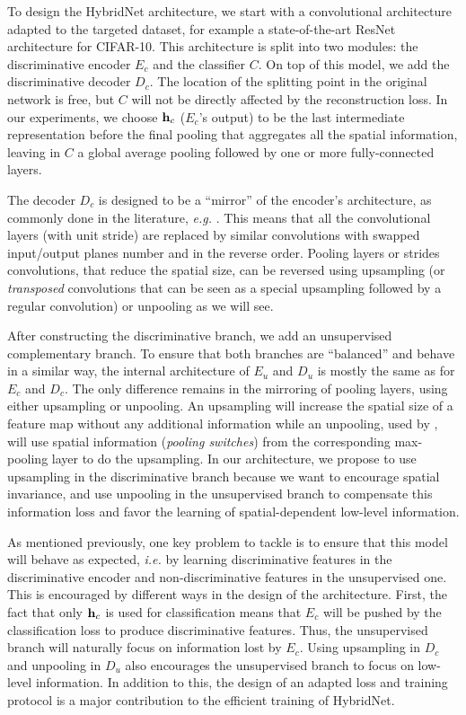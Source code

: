 To design the HybridNet architecture, we start with a convolutional architecture adapted to the targeted dataset, for example a state-of-the-art ResNet architecture for CIFAR-10. This architecture is split into two modules: the discriminative encoder $E_c$ and the classifier $C$. On top of this model, we add the discriminative decoder $D_c$.
The location of the splitting point in the original network is free, but $C$ will not be directly affected by the reconstruction loss. In our experiments, we choose $\mathbf{h}_c$ ($E_c$'s output) to be the last intermediate representation before the final pooling that aggregates all the spatial information, leaving in $C$ a global average pooling followed by one or more fully-connected layers.

The decoder $D_c$ is designed to be a ``mirror'' of the encoder's architecture, as commonly done in the literature, \textit{e.g.} \citep{Zhao2016a,Rasmus2015,zeiler2014visualizing}. This means that all the convolutional layers (with unit stride) are replaced by similar convolutions with swapped input/output planes number and in the reverse order. Pooling layers or strides convolutions, that reduce the spatial size, can be reversed using upsampling (or \textit{transposed} convolutions \citep[\textit{cf.}][]{dumoulin2016guide} that can be seen as a special upsampling followed by a regular convolution) or unpooling as we will see.

After constructing the discriminative branch, we add an unsupervised complementary branch. To ensure that both branches are ``balanced'' and behave in a similar way, the internal architecture of $E_u$ and $D_u$ is mostly the same as for $E_c$ and $D_c$.
The only difference remains in the mirroring of pooling layers, using either upsampling or unpooling. An upsampling will increase the spatial size of a feature map without any additional information while an unpooling, used by \citet{Zhao2016a,Zhang2016a}, will use spatial information (\textit{pooling switches}) from the corresponding max-pooling layer to do the upsampling. In our architecture, we propose to use upsampling in the discriminative branch because we want to encourage spatial invariance, and use unpooling in the unsupervised branch to compensate this information loss and favor the learning of spatial-dependent low-level information.

As mentioned previously, one key problem to tackle is to ensure that this model will behave as expected, \textit{i.e.} by learning discriminative features in the discriminative encoder and non-discriminative features in the unsupervised one.
This is encouraged by different ways in the design of the architecture. First, the fact that only $\mathbf{h}_c$ is used for classification means that $E_c$ will be pushed by the classification loss to produce discriminative features. Thus, the unsupervised branch will naturally focus on information lost by $E_c$. Using upsampling in $D_c$ and unpooling in $D_u$ also encourages the unsupervised branch to focus on low-level information. In addition to this, the design of an adapted loss and training protocol is a major contribution to the efficient training of HybridNet.


